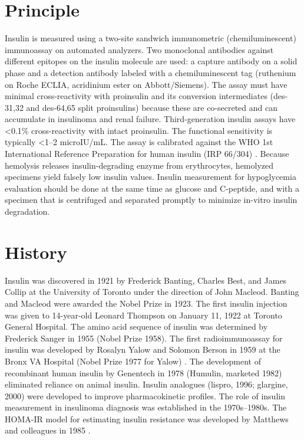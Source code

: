 \section*{Principle}
Insulin is measured using a two-site sandwich immunometric (chemiluminescent) immunoassay on automated analyzers. Two monoclonal antibodies against different epitopes on the insulin molecule are used: a capture antibody on a solid phase and a detection antibody labeled with a chemiluminescent tag (ruthenium on Roche ECLIA, acridinium ester on Abbott/Siemens). The assay must have minimal cross-reactivity with proinsulin and its conversion intermediates (des-31,32 and des-64,65 split proinsulins) because these are co-secreted and can accumulate in insulinoma and renal failure. Third-generation insulin assays have <0.1\% cross-reactivity with intact proinsulin. The functional sensitivity is typically <1--2 microIU/mL. The assay is calibrated against the WHO 1st International Reference Preparation for human insulin (IRP 66/304) \cite{tietz2023textbook}. Because hemolysis releases insulin-degrading enzyme from erythrocytes, hemolyzed specimens yield falsely low insulin values. Insulin measurement for hypoglycemia evaluation should be done at the same time as glucose and C-peptide, and with a specimen that is centrifuged and separated promptly to minimize in-vitro insulin degradation.

\section*{History}
Insulin was discovered in 1921 by Frederick Banting, Charles Best, and James Collip at the University of Toronto under the direction of John Macleod. Banting and Macleod were awarded the Nobel Prize in 1923. The first insulin injection was given to 14-year-old Leonard Thompson on January 11, 1922 at Toronto General Hospital. The amino acid sequence of insulin was determined by Frederick Sanger in 1955 (Nobel Prize 1958). The first radioimmunoassay for insulin was developed by Rosalyn Yalow and Solomon Berson in 1959 at the Bronx VA Hospital (Nobel Prize 1977 for Yalow) \cite{yalow1960immunoassay}. The development of recombinant human insulin by Genentech in 1978 (Humulin, marketed 1982) eliminated reliance on animal insulin. Insulin analogues (lispro, 1996; glargine, 2000) were developed to improve pharmacokinetic profiles. The role of insulin measurement in insulinoma diagnosis was established in the 1970s--1980s. The HOMA-IR model for estimating insulin resistance was developed by Matthews and colleagues in 1985 \cite{matthews1985homeostasis}.

